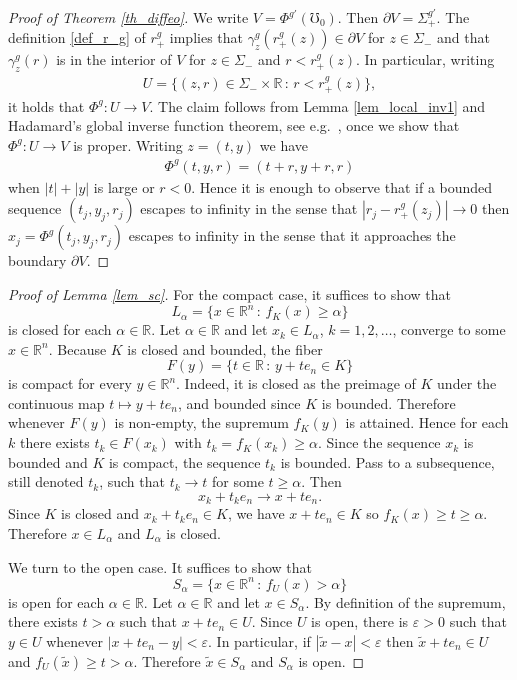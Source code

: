 \documentclass[11pt,letterpaper]{amsart}
\theoremstyle{definition}
\numberwithin{equation}{section}
\newcommand{\p}{\partial}
\def\p{\partial}
\def\R{\mathbb R}
\def\mid{\,:\,}
\begin{document}
\begin{proof}[Proof of Theorem \ref{th_diffeo}]
We write $V = \Phi^{g'}(\mho_0)$. Then $\p V = \Sigma_+^{g'}$.
The definition \eqref{def_r_g} of $r_+^g$ implies that
$\gamma_z^g(r_+^g(z)) \in \p V$ for $z \in \Sigma_-$ and that $\gamma_z^g(r)$ is in the interior of $V$ for $z \in \Sigma_-$ and $r < r_+^g(z)$. In particular, writing
    \begin{align*}
U = \{ (z, r) \in \Sigma_- \times \R \mid r < r_+^{g}(z)\},
    \end{align*}
it holds that $\Phi^{g} : U \to V$. The claim follows from Lemma \ref{lem_local_inv1} and Hadamard's global inverse function theorem, see e.g.\ \cite[Theorem 6.2.8]{krantz2002}, once we show that $\Phi^{g} : U \to V$ is proper. Writing $z = (t, y)$ we have 
    \begin{align*}
\Phi^{g}(t, y, r) = (t + r, y + r, r)
    \end{align*}
when $|t| + |y|$ is large or $r < 0$. Hence it is enough to observe that if a bounded sequence $(t_j, y_j, r_j)$ escapes to infinity in the sense that $|r_j - r_+^{g}(z_j)| \to 0$ then $x_j = \Phi^{g}(t_j, y_j, r_j)$ escapes to infinity in the sense that it approaches the boundary $\p V$.
\end{proof}

\begin{proof}[Proof of Lemma \ref{lem_sc}]
For the compact case, it suffices to show that 
\[
  L_\alpha = \{x \in \mathbb{R}^n \mid f_K(x) \geq \alpha \}
\]
is closed for each $\alpha \in \mathbb{R}$.
Let $\alpha \in \mathbb{R}$ and let $x_k \in L_\alpha$, $k=1,2,\dots$, converge to some $x \in \mathbb{R}^n$.
Because $K$ is closed and bounded, the fiber
\[
  F(y) = \{t \in \mathbb{R} \mid y + t e_n \in K \}
\]
is compact for every $y \in \R^n$. Indeed, it is closed as the preimage of $K$
under the continuous map $t \mapsto y + t e_n$, and bounded since $K$ is bounded.
Therefore whenever $F(y)$ is non-empty, the supremum $f_K(y)$ is attained.
Hence for each $k$ there exists $t_k \in F(x_k)$ with $t_k = f_K(x_k) \geq \alpha$.
Since the sequence $x_k$ is bounded and $K$ is compact, 
the sequence $t_k$ is bounded.
Pass to a subsequence, still denoted $t_k$, such that $t_k \to t$ for some $t \geq \alpha$.
Then
\[
x_k + t_k e_n \to x + t e_n.
\]
Since $K$ is closed and $x_k + t_k e_n \in K$, we have
$x + t e_n \in K$ so $f_K(x) \geq t \geq \alpha$.
Therefore $x \in L_\alpha$ and $L_\alpha$ is closed. 

We turn to the open case. 
It suffices to show that 
\[
  S_\alpha = \{ x \in \mathbb{R}^n \mid f_U(x) > \alpha \}
\]
is open for each $\alpha \in \mathbb{R}$.
Let $\alpha \in \mathbb{R}$ and let $x \in S_\alpha$.
By definition of the supremum, there exists $t > \alpha$ such that
$x + t e_n \in U$.
Since $U$ is open, there is $\varepsilon > 0$ such that $y \in U$ whenever $|x + t e_n - y| < \varepsilon$. In particular, if $|\tilde x - x| < \varepsilon$ then $\tilde x + t e_n \in U$ and $f_U(\tilde x) \geq t > \alpha$. Therefore $\tilde x \in S_\alpha$ and 
$S_\alpha$ is open. 
\end{proof}






\end{document}
